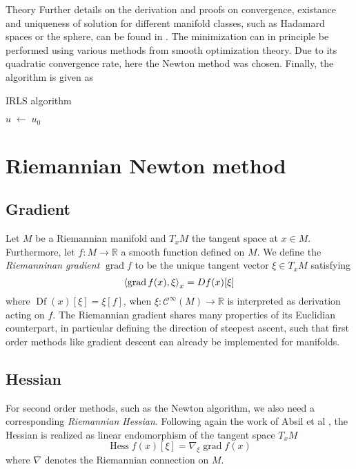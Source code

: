 \begin{chapter}{Theory}
Further details on the derivation and proofs on convergence, existance and uniqueness of solution for different manifold classes, such as Hadamard spaces or the sphere,
can be found in \cite{SprecherIRLS}. The minimization can in principle be performed using various methods from smooth optimization theory. Due to its quadratic
convergence rate, here the Newton method was chosen. Finally, the algorithm is given as 

\begin{algorithm}
\caption{IRLS algorithm}
\label{eq:parallel_irls}
\begin{algorithmic}
    \STATE $u\; \leftarrow\;u_0$
\end{algorithmic}
\end{algorithm}

\section{Riemannian Newton method} %
\label{sec:Riemannian Newton method}

\subsection{Gradient} %
\label{sub:Gradient}
Let $M$ be a Riemannian manifold and $T_xM$ the tangent space at $x\in M$. Furthermore, let $f: M\to\mathbb{R}$ a smooth function defined on $M$.
We define the \emph{Riemanninan gradient} $\operatorname{grad} f$ to be the unique tangent vector $\xi\in T_xM$ satisfying 
\begin{equation}
    \label{eq:gradient}
    \left\langle \operatorname{grad}f(x),\xi \right\rangle_x=\mathop{Df}(x)[\xi]
\end{equation}
where $\mathop{Df}(x)[\xi] = \xi[f]$, when $\xi:\mathcal{C}^{\infty}(M)\to\mathbb{R}$ is interpreted as derivation acting on $f$. The Riemannian gradient
shares many properties of its Euclidian counterpart, in particular defining the direction of steepest ascent, such that first order methods like
gradient descent can already be implemented for manifolds.\\

\subsection{Hessian} %
\label{sub:Hessian}
For second order methods, such as the Newton algorithm, we also need a corresponding \emph{Riemannian Hessian}. Following again the work 
of Absil et al \cite{AbsilOptim}, the Hessian is realized as linear endomorphism of the tangent space $T_xM$
\begin{equation}
    \label{eq:hessian}
    \operatorname{Hess}f(x)[\xi]=\nabla_{\xi}\operatorname{grad}f(x)
\end{equation}
where $\nabla$ denotes the Riemannian connection on $M$.\\


\end{chapter}
